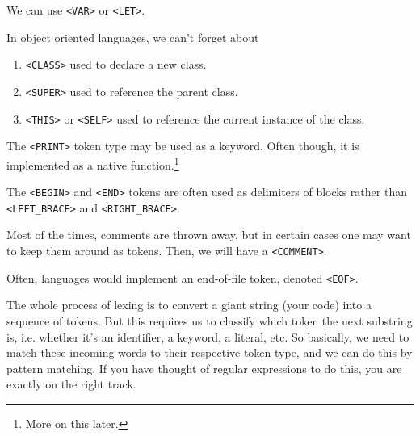   \begin{example}
    \label{ex:varibale-declaration}
    We can use \texttt{<VAR>} or \texttt{<LET>}. 
  \end{example}

  \begin{example}[Classes]
    \label{ex:classes}
    In object oriented languages, we can't forget about 
    \begin{enumerate}
      \item \texttt{<CLASS>} used to declare a new class. 
      \item \texttt{<SUPER>} used to reference the parent class. 
      \item \texttt{<THIS>} or \texttt{<SELF>} used to reference the current instance of the class. 
    \end{enumerate}
  \end{example}

  \begin{example}[Print]
    \label{ex:print}
    The \texttt{<PRINT>} token type may be used as a keyword. Often though, it is implemented as a native function.\footnote{More on this later.}
  \end{example}

  \begin{example}
    \label{ex:begin-end}
    The \texttt{<BEGIN>} and \texttt{<END>} tokens are often used as delimiters of blocks rather than \texttt{<LEFT\_BRACE>} and \texttt{<RIGHT\_BRACE>}. 
  \end{example}

  \begin{example}[Comment]
    \label{ex:comment}
    Most of the times, comments are thrown away, but in certain cases one may want to keep them around as tokens. Then, we will have a \texttt{<COMMENT>}. 
  \end{example}

  \begin{example}
    \label{ex:end-of-file}
    Often, languages would implement an end-of-file token, denoted \texttt{<EOF>}. 
  \end{example}

  The whole process of lexing is to convert a giant string (your code) into a sequence of tokens. But this requires us to classify which token the next substring is, i.e. whether it's an identifier, a keyword, a literal, etc. So basically, we need to match these incoming words to their respective token type, and we can do this by pattern matching. If you have thought of regular expressions to do this, you are exactly on the right track. 

